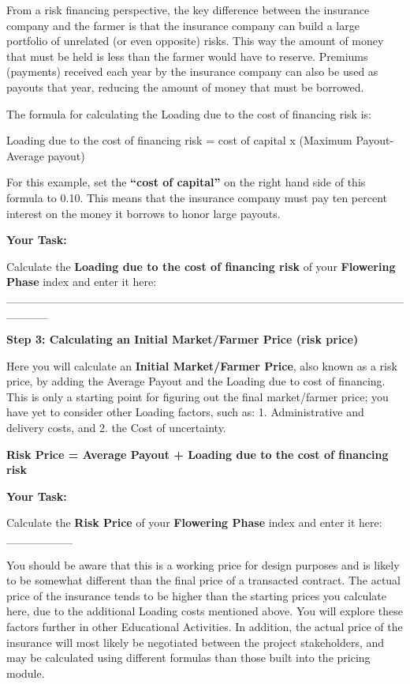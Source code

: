 \documentclass[letterpaper,10pt,english]{sphinxmanual}
\begin{document}
From a risk financing perspective, the key difference between the insurance company and the farmer is that the insurance company can build a large portfolio of unrelated (or even opposite) risks. This way the amount of money that must be held is less than the farmer would have to reserve. Premiums (payments) received each year by the insurance company can also be used as payouts that year, reducing the amount of money that must be borrowed.

The formula for calculating the Loading due to the cost of financing risk is:

Loading due to the cost of financing risk = cost of capital x (Maximum Payout-Average payout)

For this example, set the \textbf{``cost of capital''} on the right hand side of this formula to 0.10. This means that the insurance company must pay ten percent interest on the money it borrows to honor large payouts.

\textbf{Your Task:}

Calculate the \textbf{Loading due to the cost of financing risk} of your \textbf{Flowering Phase} index and enter it here: \_\_\_\_\_\_\_\_\_\_\_\_\_\_\_\_\_\_\_\_\_\_\_\_\_\_\_\_\_\_\_\_\_\_\_\_\_\_\_\_\_\_\_\_\_\_\_\_\_\_\_\_\_

\textbf{Step 3: Calculating an Initial Market/Farmer Price (risk price)}

Here you will calculate an \textbf{Initial Market/Farmer Price}, also known as a risk price, by adding the Average Payout and the Loading due to cost of financing. This is only a starting point for figuring out the final market/farmer price; you have yet to consider other Loading factors, such as: 1. Administrative and delivery costs, and 2. the Cost of uncertainty.

\textbf{Risk Price = Average Payout + Loading due to the cost of financing risk}

\textbf{Your Task:}

Calculate the \textbf{Risk Price} of your \textbf{Flowering Phase} index and enter it here: \_\_\_\_\_\_\_\_

You should be aware that this is a working price for design purposes and is likely to be somewhat different than the final price of a transacted contract. The actual price of the insurance tends to be higher than the starting prices you calculate here, due to the additional Loading costs mentioned above. You will explore these factors further in other Educational Activities. In addition, the actual price of the insurance will most likely be negotiated between the project stakeholders, and may be calculated using different formulas than those built into the pricing module.
\end{document}
